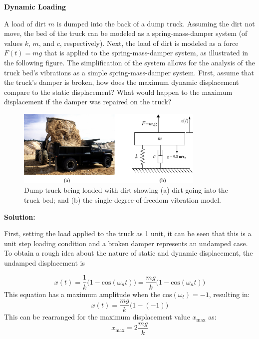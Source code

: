 \documentclass[12pt,letter]{article}
\begin{document}
\begin{example}

		\textbf{Dynamic Loading}

		\noindent A load of dirt $m$ is dumped into the back of a dump truck. Assuming the dirt not move, the bed of the truck can be modeled as a spring-mass-damper system (of values $k$, $m$, and $c$, respectively). Next, the load of dirt is modeled as a force $F(t) = m g$ that is applied to the spring-mass-damper system, as illustrated in the following figure. The simplification of the system allows for the analysis of the truck bed's vibrations as a simple spring-mass-damper system. First, assume that the truck's damper is broken, how does the maximum dynamic displacement compare to the static displacement? What would happen to the maximum displacement if the damper was repaired on the truck? %

\begin{figure}[H]
	\centering
	\includegraphics[width=0.8\textwidth]{../figures/dump_truck_example}
	\caption{Dump truck being loaded with dirt showing (a) dirt going into the truck bed\protect\footnotemark[1]; and (b) the single-degree-of-freedom vibration model.  }
\end{figure}

\noindent\textbf{Solution:} 

\noindent First, setting the load applied to the truck as 1 unit, it can be seen that this is a unit step loading condition and a broken damper represents an undamped case. To obtain a rough idea about the nature of static and dynamic displacement, the undamped displacement is

\begin{equation}
	x(t) = \frac{1}{k}\big(1-\text{cos}(\omega_n t)\big) = \frac{m g}{k}\big(1-\text{cos}(\omega_n t)\big)
\end{equation}
This equation has a maximum amplitude when the cos$(\omega_t)=-1$, resulting in:
\begin{equation}
	x(t) = \frac{m g}{k}\big(1-(-1)\big)
\end{equation}
This can be rearranged for the maximum displacement value $x_\text{max} $ as:
\begin{equation}
	x_\text{max} = 2\frac{m g}{k}
\end{equation} 


\end{example}
\end{document}
